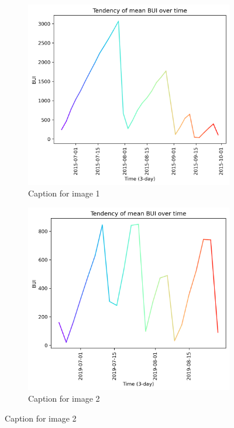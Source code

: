 \begin{figure}[h]
	\caption{HELLo}
	\centering
	\begin{subfigure}{0.49\textwidth}
		\centering
		\includegraphics[width=\textwidth]{graphs/2015/tendency/2015_tendency_graph_BUI.png}
		\caption{Caption for image 1}
		\label{fig:img1}
	\end{subfigure}
	\hfill
	\begin{subfigure}{0.49\textwidth}
		\centering
		\includegraphics[width=\textwidth]{graphs/2019/tendency/2019_tendency_graph_BUI.png}
		\caption{Caption for image 2}
		\label{fig:img2}
	\end{subfigure}
	\label{fig:both_images}
\end{figure}




